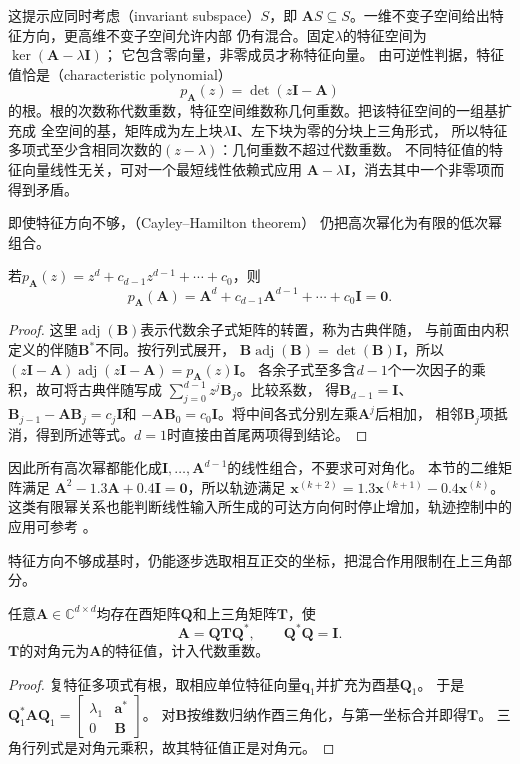 这提示应同时考虑（invariant subspace）$S$，即
$\bm A S\subseteq S$。一维不变子空间给出特征方向，更高维不变子空间允许内部
仍有混合。固定$\lambda$的特征空间为$\ker(\bm A-\lambda\bm I)$；
它包含零向量，非零成员才称特征向量。
由可逆性判据，特征值恰是（characteristic polynomial）
\begin{equation}
 p_{\bm A}(z)=\det(z\bm I-\bm A)
 \label{eq:matrix-analysis-characteristic-polynomial}
\end{equation}
的根。根的次数称代数重数，特征空间维数称几何重数。把该特征空间的一组基扩充成
全空间的基，矩阵成为左上块$\lambda\bm I$、左下块为零的分块上三角形式，
所以特征多项式至少含相同次数的$(z-\lambda)$：几何重数不超过代数重数。
不同特征值的特征向量线性无关，可对一个最短线性依赖式应用
$\bm A-\lambda\bm I$，消去其中一个非零项而得到矛盾。

即使特征方向不够，（Cayley--Hamilton theorem）
仍把高次幂化为有限的低次幂组合。
\begin{theorem}
若$p_{\bm A}(z)=z^d+c_{d-1}z^{d-1}+\cdots+c_0$，则
\[
 p_{\bm A}(\bm A)
 =\bm A^d+c_{d-1}\bm A^{d-1}+\cdots+c_0\bm I=\bm0.
\]
\end{theorem}
\begin{proof}
这里$\operatorname{adj}(\bm B)$表示代数余子式矩阵的转置，称为古典伴随，
与前面由内积定义的伴随$\bm B^*$不同。按行列式展开，
$\bm B\operatorname{adj}(\bm B)=\det(\bm B)\bm I$，所以
$(z\bm I-\bm A)\operatorname{adj}(z\bm I-\bm A)=p_{\bm A}(z)\bm I$。
各余子式至多含$d-1$个一次因子的乘积，故可将古典伴随写成
$\sum_{j=0}^{d-1}z^j\bm B_j$。比较系数，
得$\bm B_{d-1}=\bm I$、
$\bm B_{j-1}-\bm A\bm B_j=c_j\bm I$和
$-\bm A\bm B_0=c_0\bm I$。将中间各式分别左乘$\bm A^j$后相加，
相邻$\bm B_j$项抵消，得到所述等式。$d=1$时直接由首尾两项得到结论。
\end{proof}
因此所有高次幂都能化成$\bm I,\ldots,\bm A^{d-1}$的线性组合，不要求可对角化。
本节的二维矩阵满足
$\bm A^2-1.3\bm A+0.4\bm I=\bm0$，所以轨迹满足
$\bm x^{(k+2)}=1.3\bm x^{(k+1)}-0.4\bm x^{(k)}$。
这类有限幂关系也能判断线性输入所生成的可达方向何时停止增加，轨迹控制中的应用可参考
。


特征方向不够成基时，仍能逐步选取相互正交的坐标，把混合作用限制在上三角部分。
\begin{theorem}[复Schur分解]
任意$\bm A\in\mathbb C^{d\times d}$均存在酉矩阵$\bm Q$和上三角矩阵$\bm T$，使
\begin{equation}
 \bm A=\bm Q\bm T\bm Q^*,\qquad \bm Q^*\bm Q=\bm I.
 \label{eq:matrix-analysis-schur-decomposition}
\end{equation}
$\bm T$的对角元为$\bm A$的特征值，计入代数重数。
\end{theorem}
\begin{proof}
复特征多项式有根，取相应单位特征向量$\bm q_1$并扩充为酉基$\bm Q_1$。
于是$\bm Q_1^*\bm A\bm Q_1=
\left[\begin{smallmatrix}\lambda_1&\bm a^*\\0&\bm B\end{smallmatrix}\right]$。
对$\bm B$按维数归纳作酉三角化，与第一坐标合并即得$\bm T$。
三角行列式是对角元乘积，故其特征值正是对角元。
\end{proof}

